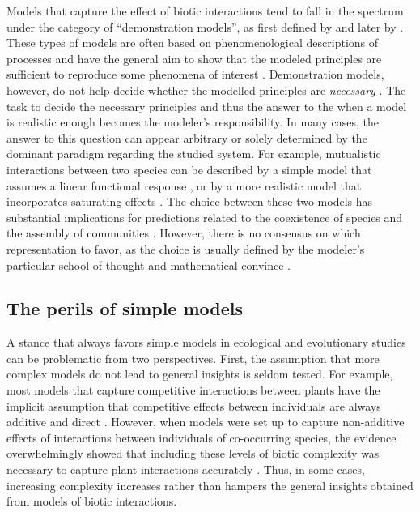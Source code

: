 \begin{refsection}
Models that capture the effect of biotic interactions tend to fall in the spectrum under the category of ``demonstration models'', as first defined by \citet{crick1988mad} and later by \citet{evans2013simple}. These types of models are often based on phenomenological descriptions of processes and have the general aim to show that the modeled principles are sufficient to reproduce some phenomena of interest \citep{crick1988mad,evans2013simple}.  Demonstration models, however, do not help decide whether the modelled principles are \textit{necessary} \citep{evans2013simple}. The task to decide the necessary principles and thus the answer to the when a model is realistic enough becomes the modeler's responsibility. In many cases, the answer to this question can appear arbitrary or solely determined by the dominant paradigm regarding the studied system. For example, mutualistic interactions between two species can be described by a simple model that assumes a linear functional response \citep{bascompte2006asymmetric}, or by a more realistic model that incorporates saturating effects \citep{holland2002population}.  The choice between these two models has substantial implications for predictions related to the coexistence of species and the assembly of communities \citep{holland2002population}. However, there is no consensus on which representation to favor, as the choice is usually defined by the modeler's particular school of thought and mathematical convince \citep{holland2006comment, bascompte2006response}.

\subsection*{The perils of simple models}
A stance that always favors simple models in ecological and evolutionary studies can be problematic from two perspectives. First, the assumption that more complex models do not lead to general insights is seldom tested. For example, most models that capture competitive interactions between plants have the implicit assumption that competitive effects between individuals are always additive and direct \citep{schoener1974some,freckleton2001predicting,kraft2015plant}.  However, when models were set up to capture non-additive effects of interactions between individuals of co-occurring species, the evidence overwhelmingly showed that including these levels of biotic complexity was necessary to capture plant interactions accurately \citep{mayfield2017higher,martyn2021identifying,lai2021non}.  Thus, in some cases, increasing complexity increases rather than hampers the general insights obtained from models of biotic interactions.


\end{refsection}
